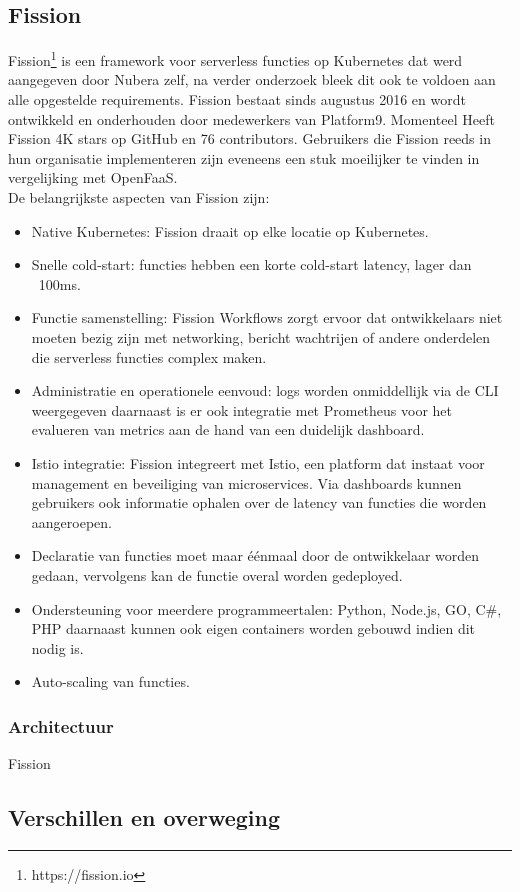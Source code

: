 \subsection{Fission}
Fission\footnote{https://fission.io} is een framework voor serverless functies op Kubernetes dat werd aangegeven door Nubera zelf, na verder onderzoek bleek dit ook te voldoen aan alle opgestelde requirements. Fission bestaat sinds augustus 2016 en wordt ontwikkeld en onderhouden door medewerkers van Platform9. Momenteel Heeft Fission 4K stars op GitHub en 76 contributors. Gebruikers die Fission reeds in hun organisatie implementeren zijn eveneens een stuk moeilijker te vinden in vergelijking met OpenFaaS.
\\
De  belangrijkste aspecten van Fission zijn:
\begin{itemize}
    \item Native Kubernetes: Fission draait op elke locatie op Kubernetes.
    \item Snelle cold-start: functies hebben een korte cold-start latency, lager dan ~100ms.
    \item Functie samenstelling: Fission Workflows zorgt ervoor dat ontwikkelaars niet moeten bezig zijn met networking, bericht wachtrijen of andere onderdelen die serverless functies complex maken.
    \item Administratie en operationele eenvoud: logs worden onmiddellijk via de CLI weergegeven daarnaast is er ook integratie met Prometheus voor het evalueren van metrics aan de hand van een duidelijk dashboard.
    \item Istio integratie: Fission integreert met Istio, een platform dat instaat voor management en beveiliging van microservices. Via dashboards kunnen gebruikers ook informatie ophalen over de latency van functies die worden aangeroepen.
    \item Declaratie van functies moet maar éénmaal door de ontwikkelaar worden gedaan, vervolgens kan de functie overal worden gedeployed.
    \item Ondersteuning voor meerdere programmeertalen: Python, Node.js, GO, C\#, PHP daarnaast kunnen ook eigen containers worden gebouwd indien dit nodig is. 
    \item Auto-scaling van functies. 
\end{itemize}

\subsubsection{Architectuur}
Fission

\subsection{Verschillen en overweging}